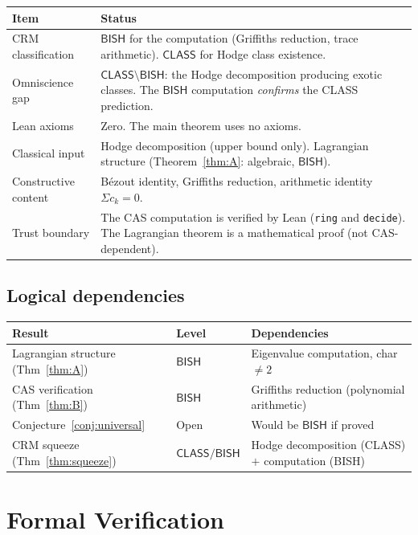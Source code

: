 \documentclass[11pt]{article}
\theoremstyle{plain}
\theoremstyle{definition}
\theoremstyle{remark}
\newcommand{\BISH}{\ensuremath{\mathsf{BISH}}}
\newcommand{\CLASS}{\ensuremath{\mathsf{CLASS}}}
\begin{document}
\begin{center}
\begin{tabular}{lp{7cm}}
\toprule
\textbf{Item} & \textbf{Status} \\
\midrule
CRM classification & $\BISH$ for the computation
  (Griffiths reduction, trace arithmetic). $\CLASS$ for Hodge class existence. \\
Omniscience gap & $\CLASS \setminus \BISH$: the Hodge decomposition
  producing exotic classes. The $\BISH$ computation
  \emph{confirms} the CLASS prediction. \\
Lean axioms & Zero. The main theorem uses no axioms. \\
Classical input & Hodge decomposition (upper bound only).
  Lagrangian structure (Theorem~\ref{thm:A}: algebraic, $\BISH$). \\
Constructive content & B\'ezout identity, Griffiths reduction,
  arithmetic identity $\Sigma c_k = 0$. \\
Trust boundary & The CAS computation is verified by Lean
  (\texttt{ring} and \texttt{decide}). The Lagrangian theorem
  is a mathematical proof (not CAS-dependent). \\
\bottomrule
\end{tabular}
\end{center}

\subsection{Logical dependencies}

\begin{center}
\begin{tabular}{llp{5.5cm}}
\toprule
\textbf{Result} & \textbf{Level} & \textbf{Dependencies} \\
\midrule
Lagrangian structure (Thm~\ref{thm:A}) & $\BISH$ &
  Eigenvalue computation, char $\ne 2$ \\
CAS verification (Thm~\ref{thm:B}) & $\BISH$ &
  Griffiths reduction (polynomial arithmetic) \\
Conjecture~\ref{conj:universal} & Open &
  Would be $\BISH$ if proved \\
CRM squeeze (Thm~\ref{thm:squeeze}) & $\CLASS / \BISH$ &
  Hodge decomposition (CLASS) $+$ computation (BISH) \\
\bottomrule
\end{tabular}
\end{center}

\section{Formal Verification}\label{sec:lean}
\end{document}
